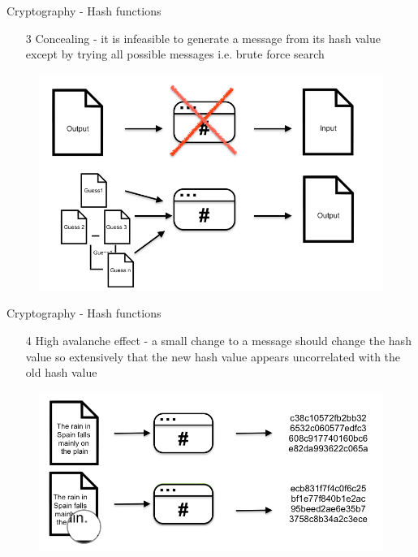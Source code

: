 \documentclass[11pt]{beamer}
\begin{document}

\begin{frame}{Cryptography - Hash functions}
	\begin{enumerate}
		\item[3] Concealing - it is infeasible to generate a message from its hash value except by trying all possible messages i.e. brute force search
	\end{enumerate}
	\begin{figure}[]
		\centering
		\includegraphics  [scale=0.3]{Images/hash3}
		\begin{centering}
		\end{centering}
	\end{figure}
\end{frame}


\begin{frame}{Cryptography - Hash functions}
	\begin{enumerate}
		\item[4] High avalanche effect - a small change to a message should change the hash value so extensively that the new hash value appears uncorrelated with the old hash value
	\end{enumerate}
	\begin{figure}[]
		\centering
		\includegraphics  [scale=0.3]{Images/hash4}
		\begin{centering}
		\end{centering}
	\end{figure}
\end{frame}
\end{document}
